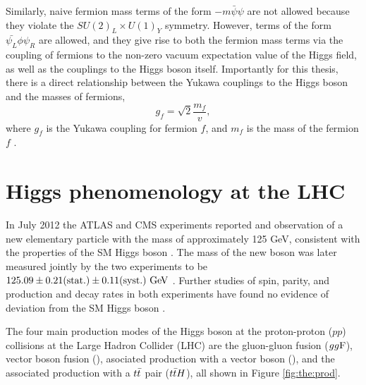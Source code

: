 Similarly, naive fermion mass terms of the form $-m \bar{\psi}\psi$ are not allowed because
they violate the $SU(2)_L \times U(1)_Y$ symmetry. However, terms of the form
$\bar{\psi_L}\phi\psi_R$ are allowed, and they give rise to both the fermion mass terms
via the coupling of fermions to the non-zero vacuum expectation value of the Higgs field,
as well as the couplings to the Higgs boson itself. Importantly for this thesis, there is 
a direct relationship between the Yukawa couplings to the Higgs boson and the
masses of fermions,
\begin{equation}
g_f = \sqrt{2}\frac{m_f}{v},
\end{equation}
where $g_f$ is the Yukawa coupling for fermion $f$, and $m_f$ is the mass of the fermion $f$ 
\cite{Thomson:2013zua}.

\section{Higgs phenomenology at the LHC}

In July 2012 the ATLAS and CMS experiments reported and observation of a new elementary particle with the
mass of approximately 125 GeV, consistent with the properties of the SM Higgs boson
\cite{Aad:2012tfa, Chatrchyan:2012xdj}. The mass of the new boson was later measured
jointly by the two experiments to be $125.09 \pm 0.21 (\text{stat.}) \pm 0.11 (\text{syst.})~\text{Ge\kern -0.1em V}$
\cite{Aad:2015zhl}. Further studies of spin, parity, and production
and decay rates in both experiments have found no evidence of deviation from the SM
Higgs boson \cite{Aad:2015mxa, PhysRevD.92.012004, Khachatryan:2016vau, Aad:2019mbh}.

The four main production modes of the Higgs boson at the proton-proton ($pp$) collisions
at the Large Hadron Collider (LHC) are the gluon-gluon fusion ($gg\text{F}$), vector boson fusion
(\vbf), asociated production with a vector boson (\vh), and the associated production with
a $t\bar{t}$ pair ($t\bar{t} H$), all shown in Figure \ref{fig:the:prod}.

